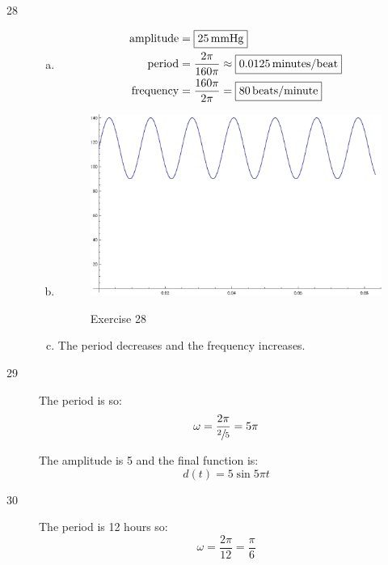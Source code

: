 \documentclass{exam}
\begin{document}
\begin{description}
      \item[28]
        \pagebreak
        \begin{enumerate}[(a)]
          \item 
            \begin{align*}
              \text{amplitude} & = \boxed{ \unit[25]{mmHg} } \\
              \text{period}    & = \frac{2 \pi}{160 \pi} \approx \boxed{ \unit[0.0125]{minutes/beat} } \\
              \text{frequency} & = \frac{160 \pi}{2 \pi} = \boxed{ \unit[80]{beats/minute} } \\
            \end{align*}

          \item 
            \begin{figure}[H]
              \centering
              \includegraphics[scale=0.6]{exercise28.eps}

              Exercise 28
            \end{figure}

          \item The period decreases and the frequency increases.

        \end{enumerate}

      \item[29] The period is  so: 
        \[
        \omega = \frac{2 \pi}{\sfrac{2}{5}} = 5 \pi
        \]

        The amplitude is 5 and the final function is:
        \[
          \boxed{ d(t) = 5 \sin 5 \pi t }
        \]

      \item[30] The period is 12 hours so: 
        \[
          \omega = \frac{2 \pi}{12} = \frac{\pi}{6}
        \]


\end{description}
\end{document}
